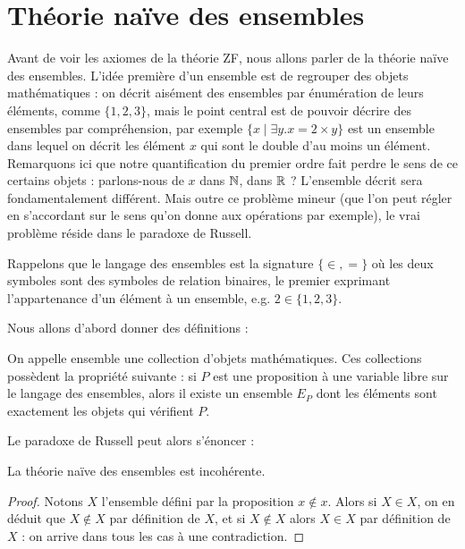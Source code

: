 \section{Théorie naïve des ensembles}

Avant de voir les axiomes de la théorie ZF, nous allons parler de la théorie naïve des ensembles. L'idée première d'un ensemble est de regrouper des objets mathématiques : on décrit aisément des ensembles par énumération de leurs éléments, comme $\{1,2,3\}$, mais le point central est de pouvoir décrire des ensembles par compréhension, par exemple $\{ x \mid \exists y. x = 2\times y\}$ est un ensemble dans lequel on décrit les élément $x$ qui sont le double d'au moins un élément. Remarquons ici que notre quantification du premier ordre fait perdre le sens de ce certains objets : parlons-nous de $x$ dans $\mathbb{N}$, dans $\mathbb{R}$ ? L'ensemble décrit sera fondamentalement différent. Mais outre ce problème mineur (que l'on peut régler en s'accordant sur le sens qu'on donne aux opérations par exemple), le vrai problème réside dans le paradoxe de Russell.

Rappelons que le langage des ensembles est la signature $\{\in,=\}$ où les deux symboles sont des symboles de relation binaires, le premier exprimant l'appartenance d'un élément à un ensemble, e.g. $2\in\{1,2,3\}$.

Nous allons d'abord donner des définitions :

\begin{defi}
    On appelle ensemble une collection d'objets mathématiques. Ces collections possèdent la propriété suivante : si $P$ est une proposition à une variable libre sur le langage des ensembles, alors il existe un ensemble $E_P$ dont les éléments sont exactement les objets qui vérifient $P$.
\end{defi}

Le paradoxe de Russell peut alors s'énoncer :

\begin{prop}
    La théorie naïve des ensembles est incohérente.
\end{prop}

\begin{proof}
    Notons $X$ l'ensemble défini par la proposition $x\notin x$. Alors si $X\in X$, on en déduit que $X\notin X$ par définition de $X$, et si $X\notin X$ alors $X\in X$ par définition de $X$ : on arrive dans tous les cas à une contradiction.
\end{proof}

